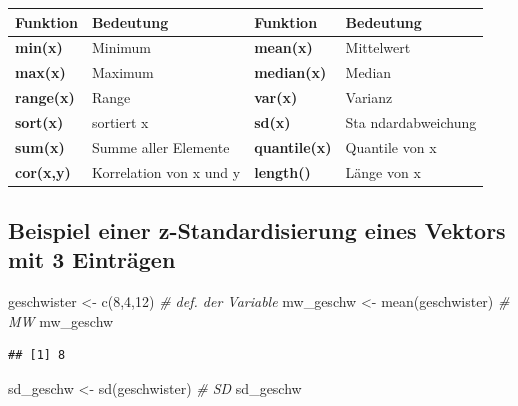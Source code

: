 \documentclass[
]{book}
\newenvironment{Shaded}{\begin{snugshade}}{\end{snugshade}}
\newcommand{\CommentTok}[1]{\textcolor[rgb]{0.56,0.35,0.01}{\textit{#1}}}
\newcommand{\DecValTok}[1]{\textcolor[rgb]{0.00,0.00,0.81}{#1}}
\newcommand{\FunctionTok}[1]{\textcolor[rgb]{0.00,0.00,0.00}{#1}}
\newcommand{\NormalTok}[1]{#1}
\newcommand{\OtherTok}[1]{\textcolor[rgb]{0.56,0.35,0.01}{#1}}
\theoremstyle{definition}
\theoremstyle{definition}
\theoremstyle{definition}
\theoremstyle{definition}
\theoremstyle{remark}
\begin{document}
\begin{longtable}[]{@{}
  >{\centering\arraybackslash}p{}
  >{\centering\arraybackslash}p{}
  >{\centering\arraybackslash}p{}
  >{\centering\arraybackslash}p{}@{}}
\toprule
Funktion & Bedeutung & Funktion & Bedeutung \\
\midrule
\endhead
\textbf{min(x)} & Minimum & \textbf{mean(x)} & Mittelwert \\
\textbf{max(x)} & Maximum & \textbf{median(x)} & Median \\
\textbf{range(x)} & Range & \textbf{var(x)} & Varianz \\
\textbf{sort(x)} & sortiert x & \textbf{sd(x)} & Sta
ndardabweichung \\
\textbf{sum(x)} & Summe aller
Elemente & \textbf{quantile(x)} & Quantile von x \\
\textbf{cor(x,y)} & Korrelation
von x und y & \textbf{length()} & Länge von x \\
\bottomrule
\end{longtable}

\hypertarget{beispiel-einer-z-standardisierung-eines-vektors-mit-3-eintruxe4gen}{%
\subsection{Beispiel einer z-Standardisierung eines Vektors mit 3 Einträgen}\label{beispiel-einer-z-standardisierung-eines-vektors-mit-3-eintruxe4gen}}

\begin{Shaded}
\begin{Highlighting}[]
\NormalTok{geschwister }\OtherTok{\textless{}{-}} \FunctionTok{c}\NormalTok{(}\DecValTok{8}\NormalTok{,}\DecValTok{4}\NormalTok{,}\DecValTok{12}\NormalTok{)                       }\CommentTok{\# def. der Variable}
\NormalTok{mw\_geschw }\OtherTok{\textless{}{-}} \FunctionTok{mean}\NormalTok{(geschwister)                 }\CommentTok{\# MW}
\NormalTok{mw\_geschw                                      }
\end{Highlighting}
\end{Shaded}

\begin{verbatim}
## [1] 8
\end{verbatim}

\begin{Shaded}
\begin{Highlighting}[]
\NormalTok{sd\_geschw }\OtherTok{\textless{}{-}} \FunctionTok{sd}\NormalTok{(geschwister)                   }\CommentTok{\# SD}
\NormalTok{sd\_geschw}
\end{Highlighting}
\end{Shaded}
\end{document}
